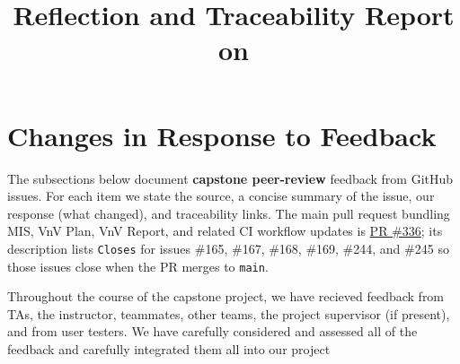 \documentclass{article}
\title{Reflection and Traceability Report on \progname}
\author{\authname}
\date{}
\begin{document}
\maketitle

\section{Changes in Response to Feedback}

The subsections below document \textbf{capstone peer-review} feedback from GitHub issues. For each item we state the source, a concise summary of the issue, our response (what changed), and traceability links. The main pull request bundling MIS, VnV Plan, VnV Report, and related CI workflow updates is \href{https://github.com/hitchly/hitchly/pull/336}{PR \#336}; its description lists \texttt{Closes} for issues \#165, \#167, \#168, \#169, \#244, and \#245 so those issues close when the PR merges to \texttt{main}.

Throughout the course of the capstone project, we have recieved feedback
from TAs, the instructor, teammates, other teams, the project supervisor (if present), and from user testers.  
We have carefully considered and assessed all of the feedback and carefully integrated them all into our project




\end{document}
